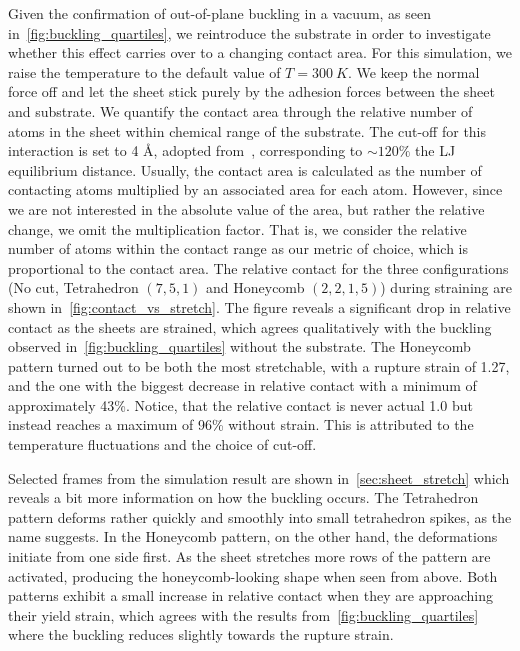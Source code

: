 Given the confirmation of out-of-plane buckling in a vacuum, as seen
in~\cref{fig:buckling_quartiles}, we reintroduce the substrate in order to
investigate whether this effect carries over to a changing contact area. For
this simulation, we raise the temperature to the default value of $T
=\SI{300}{K}$. We keep the normal force off and let the sheet stick purely by
the adhesion forces between the sheet and substrate. We quantify the contact
area through the relative number of atoms in the sheet within chemical range of
the substrate. The cut-off for this interaction is set to 4 Å, adopted
from~\cite{li_evolving_2016}, corresponding to $\sim 120\%$ the \acrshort{LJ}
equilibrium distance. Usually, the contact area is calculated as the number of
contacting atoms multiplied by an associated area for each atom. However, since
we are not interested in the absolute value of the area, but rather the relative
change, we omit the multiplication factor. That is, we consider the relative
number of atoms within the contact range as our metric of choice, which is
proportional to the contact area. The relative contact for the three
configurations (No cut, Tetrahedron $(7,5,1)$ and Honeycomb $(2,2,1,5)$) during
straining are shown in~\cref{fig:contact_vs_stretch}. The figure reveals
a significant drop in relative contact as the sheets are strained, which agrees
qualitatively with the buckling observed in~\cref{fig:buckling_quartiles}
without the substrate. The Honeycomb pattern turned out to be both the most
stretchable, with a rupture strain of 1.27, and the one with the biggest
decrease in relative contact with a minimum of approximately 43\%. Notice, that
the relative contact is never actual 1.0 but instead reaches a maximum of 96\%
without strain. This is attributed to the temperature fluctuations and the
choice of cut-off. 

Selected frames from the simulation result are shown in~\cref{sec:sheet_stretch}
which reveals a bit more information on how the buckling occurs. The Tetrahedron pattern deforms rather quickly and smoothly into small tetrahedron
spikes, as the name suggests. In the Honeycomb pattern, on the other hand, the
deformations initiate from one side first. As the sheet stretches more rows of
the pattern are activated, producing the honeycomb-looking shape when seen from
above. Both patterns exhibit a small increase in relative contact when they
are approaching their yield strain, which agrees with the results from~\cref{fig:buckling_quartiles} where the buckling reduces slightly towards the
rupture strain.


